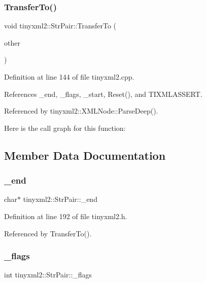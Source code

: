 \subsubsection{Transfer\+To()}
{\footnotesize\ttfamily void tinyxml2\+::\+Str\+Pair\+::\+Transfer\+To (\begin{DoxyParamCaption}\item[{\textbf{ Str\+Pair} $\ast$}]{other }\end{DoxyParamCaption})}



Definition at line 144 of file tinyxml2.\+cpp.



References \+\_\+end, \+\_\+flags, \+\_\+start, Reset(), and T\+I\+X\+M\+L\+A\+S\+S\+E\+RT.



Referenced by tinyxml2\+::\+X\+M\+L\+Node\+::\+Parse\+Deep().

Here is the call graph for this function\+:


\subsection{Member Data Documentation}
\mbox{\label{classtinyxml2_1_1_str_pair_a855c81f785458d8f84313221f2d4a1eb}} 
\subsubsection{\+\_\+end}
{\footnotesize\ttfamily char$\ast$ tinyxml2\+::\+Str\+Pair\+::\+\_\+end\hspace{0.3cm}{\ttfamily [private]}}



Definition at line 192 of file tinyxml2.\+h.



Referenced by Transfer\+To().

\mbox{\label{classtinyxml2_1_1_str_pair_ae6fabc08e7b24b0d41fa5f2fadbda4ed}} 
\subsubsection{\+\_\+flags}
{\footnotesize\ttfamily int tinyxml2\+::\+Str\+Pair\+::\+\_\+flags\hspace{0.3cm}{\ttfamily [private]}}



